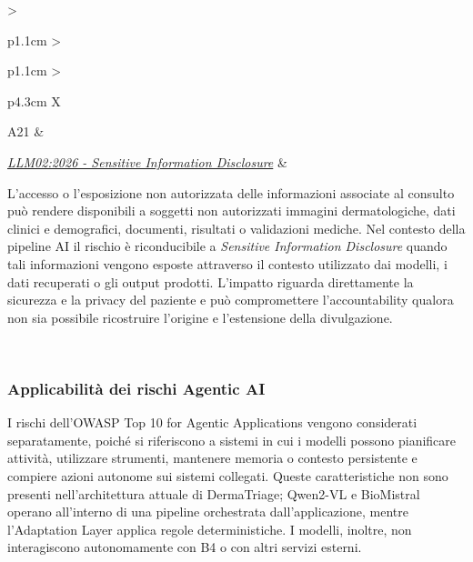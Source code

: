 {\begin{xltabular}{\textwidth}{
    >{\raggedright\arraybackslash}p{1.1cm}
    >{\raggedright\arraybackslash}p{1.1cm}
    >{\raggedright\arraybackslash}p{4.3cm}
    X
}
A21 &

\href{https://genai.owasp.org/resource/owasp-genai-llm-top-10-2026/}
{\textit{LLM02:2026 - Sensitive Information Disclosure}} &

L'accesso o l'esposizione non autorizzata delle informazioni associate
al consulto può rendere disponibili a soggetti non autorizzati immagini
dermatologiche, dati clinici e demografici, documenti, risultati o
validazioni mediche. Nel contesto della pipeline AI il rischio è
riconducibile a \textit{Sensitive Information Disclosure} quando tali
informazioni vengono esposte attraverso il contesto utilizzato dai
modelli, i dati recuperati o gli output prodotti. L'impatto riguarda
direttamente la sicurezza e la privacy del paziente e può compromettere
l'accountability qualora non sia possibile ricostruire l'origine e
l'estensione della divulgazione. \\

\bottomrule

\caption{Mapping delle minacce di DermaTriage con corrispondenza pertinente
nei rischi OWASP GenAI 2026}

\label{tab:owasp-ai-mapping}\\

\end{xltabular}
}

\subsubsection{Applicabilità dei rischi Agentic AI}

I rischi dell'OWASP Top 10 for Agentic Applications vengono considerati separatamente, poiché si riferiscono a sistemi in cui i modelli possono pianificare attività, utilizzare strumenti, mantenere memoria o contesto persistente e compiere azioni autonome sui sistemi collegati. Queste caratteristiche non sono presenti nell'architettura attuale di DermaTriage; Qwen2-VL e BioMistral operano all'interno di una pipeline orchestrata dall'applicazione, mentre l'Adaptation Layer applica regole deterministiche. I modelli, inoltre, non interagiscono autonomamente con B4 o con altri servizi esterni.

